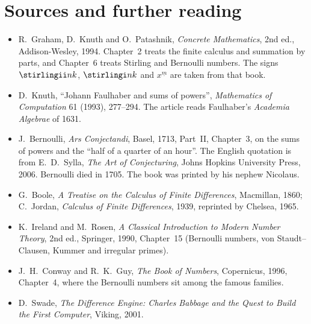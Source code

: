 \section*{Sources and further reading}

\begin{itemize}
\item R.~Graham, D.~Knuth and O.~Patashnik, \emph{Concrete Mathematics}, 2nd ed., Addison-Wesley, 1994. Chapter~2 treats the finite calculus and summation by parts, and Chapter~6 treats Stirling and Bernoulli numbers. The signs $\stirlingii nk$, $\stirlingi nk$ and $x^{\underline m}$ are taken from that book.
\item D.~Knuth, ``Johann Faulhaber and sums of powers'', \emph{Mathematics of Computation} 61 (1993), 277--294. The article reads Faulhaber's \emph{Academia Algebrae} of 1631.
\item J.~Bernoulli, \emph{Ars Conjectandi}, Basel, 1713, Part~II, Chapter~3, on the sums of powers and the ``half of a quarter of an hour''. The English quotation is from E.~D.~Sylla, \emph{The Art of Conjecturing}, Johns Hopkins University Press, 2006. Bernoulli died in 1705. The book was printed by his nephew Nicolaus.
\item G.~Boole, \emph{A Treatise on the Calculus of Finite Differences}, Macmillan, 1860; C.~Jordan, \emph{Calculus of
Finite Differences}, 1939, reprinted by Chelsea, 1965.
\item K.~Ireland and M.~Rosen, \emph{A Classical Introduction to Modern Number Theory}, 2nd ed., Springer, 1990,
Chapter~15 (Bernoulli numbers, von Staudt--Clausen, Kummer and irregular primes).
\item J.~H.~Conway and R.~K.~Guy, \emph{The Book of Numbers}, Copernicus, 1996, Chapter~4, where the Bernoulli numbers sit among the famous families.
\item D.~Swade, \emph{The Difference Engine: Charles Babbage and the Quest to Build the First Computer}, Viking, 2001.
\end{itemize}
